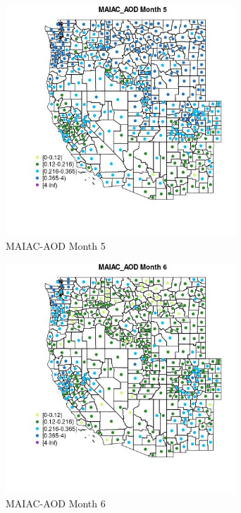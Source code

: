\begin{figure} 
\centering  
\includegraphics[width=0.77\textwidth]{Code_Outputs/df_report_ML_predictors_CountyCentroid_Locations_Dates_2008-01-01to2018-12-31_MapObsMo5MAIAC_AOD.jpg} 
\caption{\label{fig:df_report_ML_predictors_CountyCentroid_Locations_Dates_2008-01-01to2018-12-31MapObsMo5MAIAC_AOD}MAIAC-AOD Month 5} 
\end{figure} 
 

\begin{figure} 
\centering  
\includegraphics[width=0.77\textwidth]{Code_Outputs/df_report_ML_predictors_CountyCentroid_Locations_Dates_2008-01-01to2018-12-31_MapObsMo6MAIAC_AOD.jpg} 
\caption{\label{fig:df_report_ML_predictors_CountyCentroid_Locations_Dates_2008-01-01to2018-12-31MapObsMo6MAIAC_AOD}MAIAC-AOD Month 6} 
\end{figure} 
 

